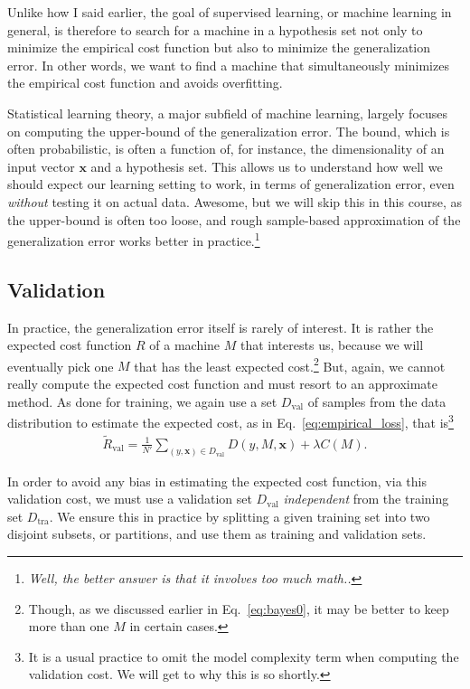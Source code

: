 \documentclass{report}
\newcommand{\vect}[1]{\mathbf{#1}}
\newcommand{\vx}[0]{\vect{x}}
\newcommand{\val}{\text{val}}
\newcommand{\tra}{\text{tra}}
\begin{document}
Unlike how I said earlier, the goal of supervised learning, or machine learning
in general, is therefore to search for a machine in a hypothesis set not only to
minimize the empirical cost function but also to minimize the generalization
error. In other words, we want to find a machine that simultaneously minimizes
the empirical cost function and avoids overfitting.

Statistical learning theory, a major subfield of machine learning, largely
focuses on computing the upper-bound of the generalization error. The bound,
which is often probabilistic, is often a function of, for instance, the
dimensionality of an input vector $\vx$ and a hypothesis set. This allows us to
understand how well we should expect our learning setting to work, in terms of
generalization error, even {\it without} testing it on actual data. Awesome, but
we will skip this in this course, as the upper-bound is often too loose, and
rough sample-based approximation of the generalization error works better in
practice.\footnote{
    {\it Well, the better answer is that it involves too much math..}
} 

\subsection{Validation}
\label{sec:validation}

In practice, the generalization error itself is rarely of interest. It is rather
the expected cost function $R$ of a machine $M$ that interests us, because we
will eventually pick one $M$ that has the least expected cost.\footnote{
    Though, as we discussed earlier in Eq.~\eqref{eq:bayes0}, it may be better
    to keep more than one $M$ in certain cases. 
} But, again, we cannot really compute the expected cost function and must
resort to an approximate method. As done for training, we again use a set
$D_{\val}$ of samples from the data distribution to estimate the expected cost,
as in Eq.~\eqref{eq:empirical_loss}, that is\footnote{
    It is a usual practice to omit the model complexity term when computing the
    validation cost. We will get to why this is so shortly.
}
\begin{align*}
    \tilde{R}_{\val} = \frac{1}{N'} \sum_{(y, \vx) \in D_{\val}} D(y, M, \vx)
    + \lambda C(M).
\end{align*}

In order to avoid any bias in estimating the expected cost function, via this
validation cost, we must use a validation set $D_{\val}$ {\it independent} from
the training set $D_{\tra}$. We ensure this in practice by splitting a given
training set into two disjoint subsets, or partitions, and use them as training
and validation sets. 
\end{document}
